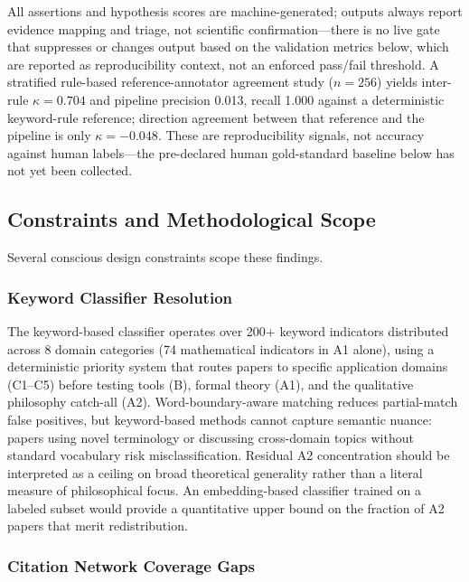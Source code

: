 \documentclass[
  english,
]{article}
\begin{document}
All assertions and hypothesis scores are machine-generated; outputs
always report evidence mapping and triage, not scientific
confirmation---there is no live gate that suppresses or changes output
based on the validation metrics below, which are reported as
reproducibility context, not an enforced pass/fail threshold. A
stratified rule-based reference-annotator agreement study (\(n = 256\))
yields inter-rule \(\kappa = 0.704\) and pipeline precision 0.013,
recall 1.000 against a deterministic keyword-rule reference; direction
agreement between that reference and the pipeline is only
\(\kappa = -0.048\). These are reproducibility signals, not accuracy
against human labels---the pre-declared human gold-standard baseline
below has not yet been collected.

\subsection{Constraints and Methodological
Scope}\label{constraints-and-methodological-scope}

Several conscious design constraints scope these findings.

\subsubsection{Keyword Classifier
Resolution}\label{keyword-classifier-resolution}

The keyword-based classifier operates over 200+ keyword indicators
distributed across 8 domain categories (74 mathematical indicators in A1
alone), using a deterministic priority system that routes papers to
specific application domains (C1--C5) before testing tools (B), formal
theory (A1), and the qualitative philosophy catch-all (A2).
Word-boundary-aware matching reduces partial-match false positives, but
keyword-based methods cannot capture semantic nuance: papers using novel
terminology or discussing cross-domain topics without standard
vocabulary risk misclassification. Residual A2 concentration should be
interpreted as a ceiling on broad theoretical generality rather than a
literal measure of philosophical focus. An embedding-based classifier
trained on a labeled subset would provide a quantitative upper bound on
the fraction of A2 papers that merit redistribution.

\subsubsection{Citation Network Coverage
Gaps}\label{citation-network-coverage-gaps}
\end{document}
